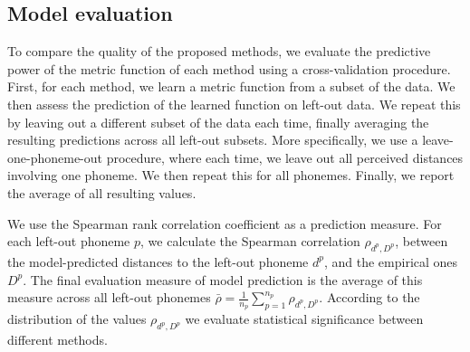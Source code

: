 \subsection{Model evaluation}
To compare the quality of the proposed methods, we evaluate the predictive power of the metric function of each method using a cross-validation procedure. First, for each method, we learn a metric function from a subset of the data. We then assess the prediction of the learned function on left-out data. We repeat this by leaving out a different subset of the data each time, finally averaging the resulting predictions across all left-out subsets. More specifically, we use a leave-one-phoneme-out procedure, where each time, we leave out all perceived distances involving one phoneme. We then repeat this for all phonemes. Finally, we report the average of all resulting values. 

We use the Spearman rank correlation coefficient as a prediction measure. For each left-out phoneme $p$, we calculate the Spearman correlation $\rho_{d^p, D^p}$, between the model-predicted distances to the left-out phoneme $d^p$, and the empirical ones $D^p$. The final evaluation measure of model prediction is the average of this measure across all left-out phonemes $\bar{\rho} = \frac{1}{n_p}\sum_{p=1}^{n_p}\rho_{d^p, D^p}$. According to the distribution of the values $\rho_{d^p, D^p}$ we evaluate statistical significance between different methods.